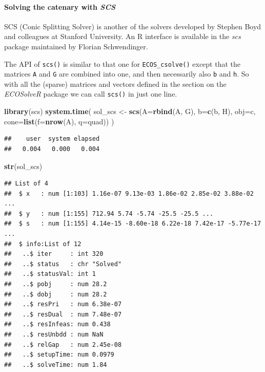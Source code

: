 \documentclass[]{article}
\newenvironment{Shaded}{\begin{snugshade}}{\end{snugshade}}
\newcommand{\KeywordTok}[1]{\textcolor[rgb]{0.13,0.29,0.53}{\textbf{{#1}}}}
\newcommand{\DataTypeTok}[1]{\textcolor[rgb]{0.13,0.29,0.53}{{#1}}}
\newcommand{\StringTok}[1]{\textcolor[rgb]{0.31,0.60,0.02}{{#1}}}
\newcommand{\NormalTok}[1]{{#1}}
\let\oldparagraph\paragraph
\renewcommand{\paragraph}[1]{\oldparagraph{#1}\mbox{}}
\begin{document}
\paragraph{\texorpdfstring{Solving the catenary with
\emph{SCS}}{Solving the catenary with SCS}}\label{solving-the-catenary-with-scs}

SCS (Conic Splitting Solver) is another of the solvers developed by
Stephen Boyd and colleagues at Stanford University. An R interface is
available in the \emph{scs} package maintained by Florian Schwendinger.

The API of \texttt{scs()} is similar to that one for
\texttt{ECOS\_csolve()} except that the matrices \texttt{A} and
\texttt{G} are combined into one, and then necessarily also \texttt{b}
and \texttt{h}. So with all the (sparse) matrices and vectors defined in
the section on the \emph{ECOSolveR} package we can call \texttt{scs()}
in just one line.

\begin{Shaded}
\begin{Highlighting}[]
\KeywordTok{library}\NormalTok{(scs)}
\KeywordTok{system.time}\NormalTok{(}
\NormalTok{sol_scs <-}\StringTok{ }\KeywordTok{scs}\NormalTok{(}\DataTypeTok{A=}\KeywordTok{rbind}\NormalTok{(A, G), }\DataTypeTok{b=}\KeywordTok{c}\NormalTok{(b, H), }\DataTypeTok{obj=}\NormalTok{c, }\DataTypeTok{cone=}\KeywordTok{list}\NormalTok{(}\DataTypeTok{f=}\KeywordTok{nrow}\NormalTok{(A), }\DataTypeTok{q=}\NormalTok{quad))}
\NormalTok{)}
\end{Highlighting}
\end{Shaded}

\begin{verbatim}
##    user  system elapsed 
##   0.004   0.000   0.004
\end{verbatim}

\begin{Shaded}
\begin{Highlighting}[]
\KeywordTok{str}\NormalTok{(sol_scs)}
\end{Highlighting}
\end{Shaded}

\begin{verbatim}
## List of 4
##  $ x   : num [1:103] 1.16e-07 9.13e-03 1.86e-02 2.85e-02 3.88e-02 ...
##  $ y   : num [1:155] 712.94 5.74 -5.74 -25.5 -25.5 ...
##  $ s   : num [1:155] 4.14e-15 -8.60e-18 6.22e-18 7.42e-17 -5.77e-17 ...
##  $ info:List of 12
##   ..$ iter     : int 320
##   ..$ status   : chr "Solved"
##   ..$ statusVal: int 1
##   ..$ pobj     : num 28.2
##   ..$ dobj     : num 28.2
##   ..$ resPri   : num 6.38e-07
##   ..$ resDual  : num 7.48e-07
##   ..$ resInfeas: num 0.438
##   ..$ resUnbdd : num NaN
##   ..$ relGap   : num 2.45e-08
##   ..$ setupTime: num 0.0979
##   ..$ solveTime: num 1.84
\end{verbatim}
\end{document}
